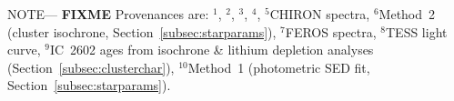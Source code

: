 \begin{table*}
\begin{tabular}{llcc}
\hline
\end{tabular}
\begin{flushleft}
 \footnotesize{ \textsc{NOTE}---
  {\bf FIXME}
Provenances are:
$^1$\citet{gaia_collaboration_gaia_2018},
$^2$\citet{stassun_TIC8_2019},
$^3$\citet{skrutskie_tmass_2006},
$^4$\citet{wright_WISE_2010},
$^5$CHIRON spectra,
$^6$Method~2 (cluster isochrone, Section~\ref{subsec:starparams}),
$^7$FEROS spectra,
$^8$TESS light curve,
$^9$IC~2602 ages from isochrone \& lithium depletion analyses (Section~\ref{subsec:clusterchar}),
$^{10}$Method~1 (photometric SED fit, Section~\ref{subsec:starparams}).}
\end{flushleft}
\vspace{-0.5cm}
\end{table*}

